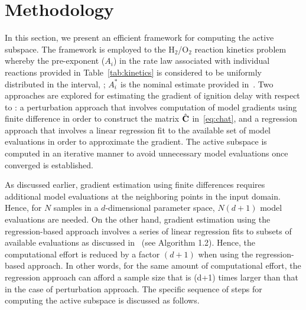 \section{Methodology}
\label{sec:method}

In this section, we present an efficient framework for computing the
active subspace. The framework is employed to the H$_2$/O$_2$ reaction kinetics
problem whereby the  
pre-exponent ($A_i$) in the rate law associated with individual reactions provided in
Table~\ref{tab:kinetics} is considered to be uniformly
distributed in the interval, ;
$A_i^\ast$ is the nominal
estimate provided in~\cite{Yetter:1991}.
Two approaches are explored for estimating the gradient of ignition delay with
respect to : 
a perturbation  approach that involves computation of model
gradients using finite difference in order to construct the matrix $\hat{\mathbf{{C}}}$
in~\eqref{eq:chat}, and a regression  approach 
that involves a linear regression fit to the available set of
model evaluations in order to approximate the gradient. 
The active subspace is computed in an iterative manner to avoid
unnecessary model evaluations once converged is established.


As discussed earlier, gradient estimation using finite differences 
requires additional model evaluations at the
neighboring points in the input domain. 
Hence, for $N$ samples in a $d$-dimensional parameter space, $N(d+1)$
model evaluations are needed. On the other hand, gradient estimation
using the regression-based approach involves a series of linear regression
fits to subsets of available evaluations as discussed 
in~\cite{Constantine:2015} (see Algorithm 1.2). Hence, the computational effort is  
reduced by a factor $(d+1)$ when using the regression-based approach.
In other words, for the same amount of computational effort, the regression
approach can afford a sample size that is (d+1) times larger than that in the
case of perturbation approach.
The specific sequence of steps
for computing the active subspace is discussed as follows.   

